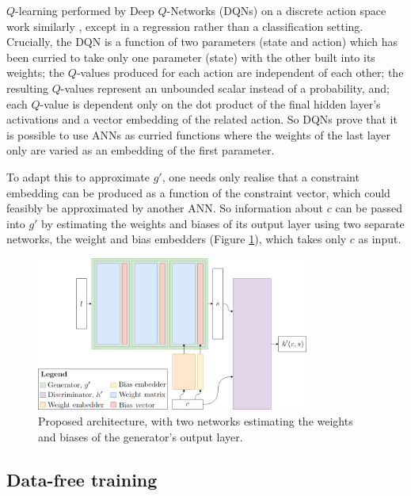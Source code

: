 \documentclass[../../main.tex]{subfiles}
\begin{document}
$Q$-learning performed by Deep $Q$-Networks (DQNs) on a discrete action space work similarly \cite{mnih15}, except in a regression rather than a classification setting.
Crucially, the DQN is a function of two parameters (state and action) which has been curried to take only one parameter (state) with the other built into its weights; the $Q$-values produced for each action are independent of each other; the resulting $Q$-values represent an unbounded scalar instead of a probability, and; each $Q$-value is dependent only on the dot product of the final hidden layer's activations and a vector embedding of the related action.
So DQNs prove that it is possible to use ANNs as curried functions where the weights of the last layer only are varied as an embedding of the first parameter.

To adapt this to approximate $g'$, one needs only realise that a constraint embedding can be produced as a function of the constraint vector, which could feasibly be approximated by another ANN.
So information about $c$ can be passed into $g'$ by estimating the weights and biases of its output layer using two separate networks, the weight and bias embedders (Figure \ref{fig:curriedGenerator}), which takes only $c$ as input.
\begin{figure}[H]
    \begin{center}
    \includegraphics[width=0.8\textwidth]{curriedGenerator}
    \caption{
		Proposed architecture, with two networks estimating the weights and biases of the generator's output layer.
    }
    \label{fig:curriedGenerator}
    \end{center}
\end{figure}

\subsection{Data-free training} \label{subsection:dataFreeTraining}
\end{document}
